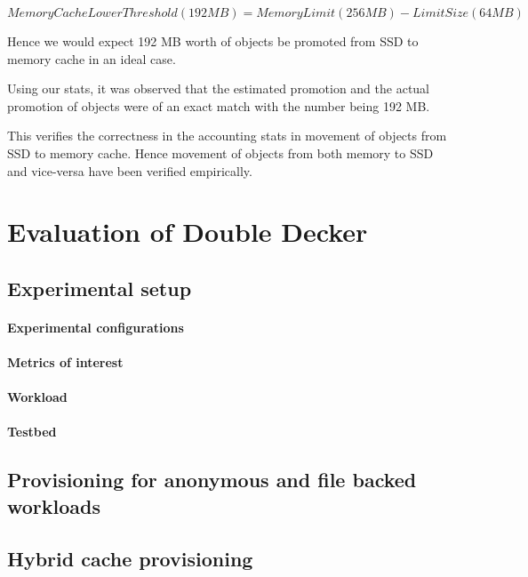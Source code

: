 	    \begin{equation}
	      MemoryCacheLowerThreshold (192 MB) = MemoryLimit (256 MB) - LimitSize (64 MB)
	    \end{equation}
	    
	    Hence we would expect 192 MB worth of objects be promoted from SSD to memory cache in an ideal case.
	    
	    
	    Using our stats, it was observed that the estimated promotion and the actual promotion of objects were of an exact match with 
	    the number being 192 MB.
	    
	    This verifies the correctness in the accounting stats in movement of objects from SSD to memory cache. Hence movement 
	    of objects from both memory to SSD and vice-versa have been verified empirically.
  
  
  
  \section{Evaluation of Double Decker}
  
    \subsection{Experimental setup}
	
	\paragraph{Experimental configurations}
	
	\paragraph{Metrics of interest}
	
	\paragraph{Workload}
	
	\paragraph{Testbed}
  
  
    \subsection{Provisioning for anonymous and file backed workloads}
    
    \subsection{Hybrid cache provisioning}
    